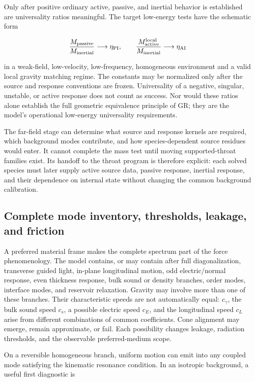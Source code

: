 Only after positive ordinary active, passive, and inertial behavior is
established are universality ratios meaningful. The target low-energy tests have
the schematic form

\[
\frac{M_{\rm passive}}{M_{\rm inertial}}
\longrightarrow \eta_{\rm PI},
\qquad
\frac{M_{\rm active}^{\rm local}}{M_{\rm inertial}}
\longrightarrow \eta_{\rm AI}
\]

in a weak-field, low-velocity, low-frequency, homogeneous environment and a
valid local gravity matching regime. The constants may be normalized only after
the source and response conventions are frozen. Universality of a negative,
singular, unstable, or active response does not count as success. Nor would
these ratios alone establish the full geometric equivalence principle of GR;
they are the model's operational low-energy universality requirements.

The far-field stage can determine what source and response kernels are required,
which background modes contribute, and how species-dependent source residues
would enter. It cannot complete the mass test until moving supported-throat
families exist. Its handoff to the throat program is therefore explicit: each
solved species must later supply active source data, passive response, inertial
response, and their dependence on internal state without changing the common
background calibration.

\subsection{Complete mode inventory, thresholds, leakage, and friction}

A preferred material frame makes the complete spectrum part of the force
phenomenology. The model contains, or may contain after full diagonalization,
transverse guided light, in-plane longitudinal motion, odd electric/normal
response, even thickness response, bulk sound or density branches, order modes,
interface modes, and reservoir relaxation. Gravity may involve more than one of
these branches. Their characteristic speeds are not automatically equal:
\(c_\gamma\), the bulk sound speed \(c_s\), a possible electric speed \(c_E\),
and the longitudinal speed \(c_L\) arise from different combinations of common
coefficients. Cone alignment may emerge, remain approximate, or fail. Each
possibility changes leakage, radiation thresholds, and the observable
preferred-medium scope.

On a reversible homogeneous branch, uniform motion can emit into any coupled
mode satisfying the kinematic resonance condition. In an isotropic background,
a useful first diagnostic is

